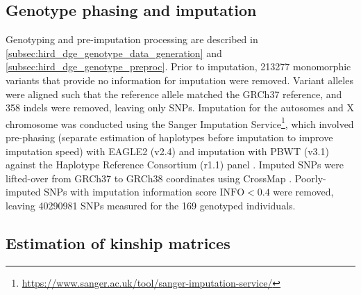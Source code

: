 \subsection{Genotype phasing and imputation}
\label{subsec:hird_reQTL_methods_genotypePhasingAndImputation}

Genotyping and pre-imputation processing are described in \cref{subsec:hird_dge_genotype_data_generation} and \cref{subsec:hird_dge_genotype_preproc}.
Prior to imputation, \num{213277} monomorphic variants that provide no information for imputation were removed.
Variant alleles were aligned such that the reference allele matched the GRCh37 reference, and 358 indels were removed, leaving only \glspl{SNP}.
Imputation for the autosomes and X chromosome was conducted using the Sanger Imputation Service\footnote{\url{https://www.sanger.ac.uk/tool/sanger-imputation-service/}}, 
which involved pre-phasing (separate estimation of haplotypes before imputation to improve imputation speed) with EAGLE2 (v2.4) \autocite{loh2016ReferencebasedPhasingUsinga}
and imputation with PBWT (v3.1) \autocite{durbin2014EfficientHaplotypeMatching}
against the Haplotype Reference Consortium (r1.1) panel \autocite{mccarthy2016ReferencePanel64}.
Imputed \glspl{SNP} were lifted-over from GRCh37 to GRCh38 coordinates using CrossMap \autocite{zhao2014CrossMapVersatileTool}.
Poorly-imputed \glspl{SNP} with imputation information score $\text{INFO} < 0.4$
were removed, leaving \num{40290981} \glspl{SNP} measured for the 169 genotyped individuals.

\subsection{Estimation of kinship matrices}
\label{subsec:hird_reQTL_LDAK}

